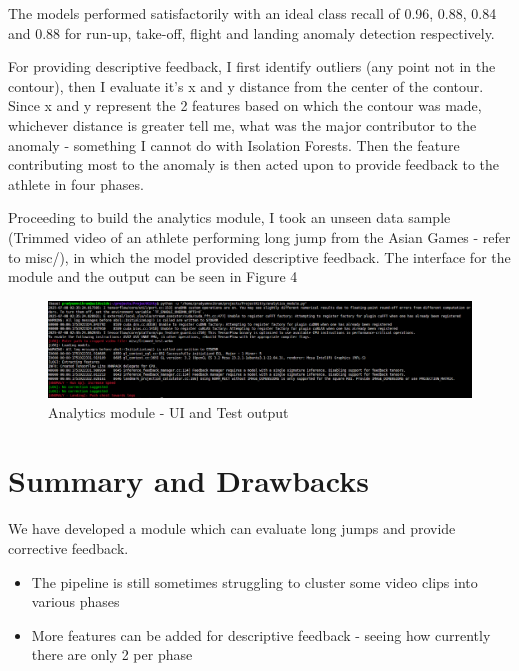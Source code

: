 \documentclass[12pt, letterpaper]{article}
\begin{document}
The models performed satisfactorily with an ideal class recall of 0.96, 0.88, 0.84 and 0.88 for run-up, take-off, flight and landing anomaly detection respectively.

For providing descriptive feedback, I first identify outliers (any point not in the contour), then I evaluate it's x and y distance from the center of the contour. Since x and y represent the 2 features based on which the contour was made, whichever distance is greater tell me, what was the major contributor to the anomaly - something I cannot do with Isolation Forests. Then the feature contributing most to the anomaly is then acted upon to provide feedback to the athlete in four phases.

Proceeding to build the analytics module, I took an unseen data sample (Trimmed video of an athlete performing long jump from the Asian Games - refer to misc/), in which the model provided descriptive feedback. The interface for the module and the output can be seen in Figure 4

\begin{figure}[htbp]
    \includegraphics[width = 1.2\textwidth]{plots/result.png}
    \caption{Analytics module - UI and Test output}
\end{figure}

\section{Summary and Drawbacks}
We have developed a module which can evaluate long jumps and provide corrective feedback.
\begin{itemize}
    \item The pipeline is still sometimes struggling to cluster some video clips into various phases
    \item More features can be added for descriptive feedback - seeing how currently there are only 2 per phase
\end{itemize} 
\end{document}

